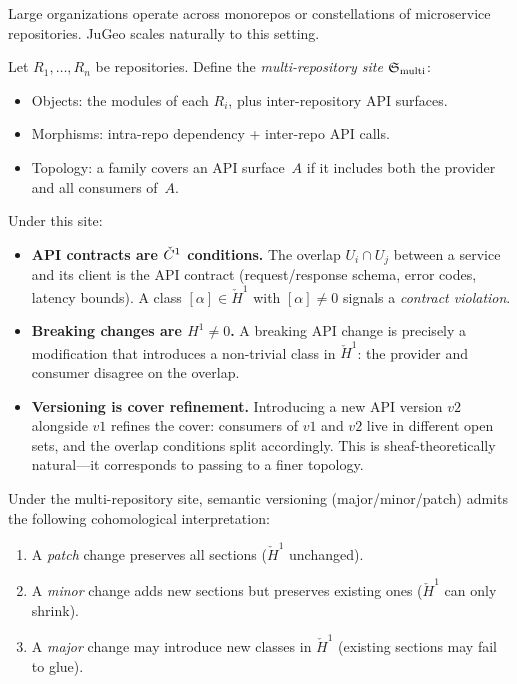 Large organizations operate across monorepos or constellations of
microservice repositories.  JuGeo scales naturally to this setting.

\begin{definition}
\label{def:multi-repo-site}
Let $R_1, \dots, R_n$ be repositories.  Define the
\emph{multi-repository site} $\mathfrak{S}_{\mathrm{multi}}$:
\begin{itemize}
  \item Objects: the modules of each $R_i$, plus inter-repository
        API surfaces.
  \item Morphisms: intra-repo dependency + inter-repo API calls.
  \item Topology: a family covers an API surface~$A$ if it
        includes both the provider and all consumers of~$A$.
\end{itemize}
\end{definition}

Under this site:
\begin{itemize}
  \item \textbf{API contracts are $\check{C}^1$ conditions.}\;
        The overlap $U_i \cap U_j$ between a service and its
        client is the API contract (request/response schema,
        error codes, latency bounds).  A class
        $[\alpha] \in \check{H}^1$ with $[\alpha]\neq 0$ signals a
        \emph{contract violation}.
  \item \textbf{Breaking changes are $H^1 \neq 0$.}\;
        A breaking API change is precisely a modification that
        introduces a non-trivial class in $\check{H}^1$: the
        provider and consumer disagree on the overlap.
  \item \textbf{Versioning is cover refinement.}\;
        Introducing a new API version $v2$ alongside $v1$ refines
        the cover: consumers of $v1$ and $v2$ live in different
        open sets, and the overlap conditions split accordingly.
        This is sheaf-theoretically natural---it corresponds to
        passing to a finer topology.
\end{itemize}

\begin{proposition}
\label{prop:semver}
Under the multi-repository site, semantic versioning
(major/minor/patch) admits the following cohomological
interpretation:
\begin{enumerate}[label=(\roman*)]
  \item A \emph{patch} change preserves all sections
        ($\check{H}^1$ unchanged).
  \item A \emph{minor} change adds new sections but
        preserves existing ones
        ($\check{H}^1$ can only shrink).
  \item A \emph{major} change may introduce new classes in
        $\check{H}^1$ (existing sections may fail to glue).
\end{enumerate}
\end{proposition}


